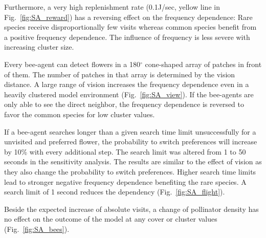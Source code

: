 Furthermore, a very high replenishment rate (0.1J/sec, yellow line in Fig.~\ref{fig:SA_reward}) has a reversing effect on the frequency dependence: Rare species receive disproportionally few visits whereas common species benefit from a positive frequency dependence. The influence of frequency is less severe with increasing cluster size. 

Every bee-agent can detect flowers in a 180$^{\circ}$ cone-shaped array of patches in front of them. The number of patches in that array is determined by the vision distance. A large range of vision increases the frequency dependence even in a heavily clustered model environment (Fig.~\ref{fig:SA_view}). If the bee-agents are only able to see the direct neighbor, the frequency dependence is reversed to favor the common species for low cluster values. 

If a bee-agent searches longer than a given search time limit unsuccessfully for a unvisited and preferred flower, the probability to switch preferences will increase by 10\% with every additional step. The search limit was altered from 1 to 50 seconds in the sensitivity analysis. The results are similar to the effect of vision as they also change the probability to switch preferences. Higher search time limits lead to stronger negative frequency dependence benefiting the rare species. A search limit of 1 second reduces the dependency (Fig.~\ref{fig:SA_flight}).

Beside the expected increase of absolute visits, a change of pollinator density has no effect on the outcome of the model at any cover or cluster values (Fig.~\ref{fig:SA_bees}).




